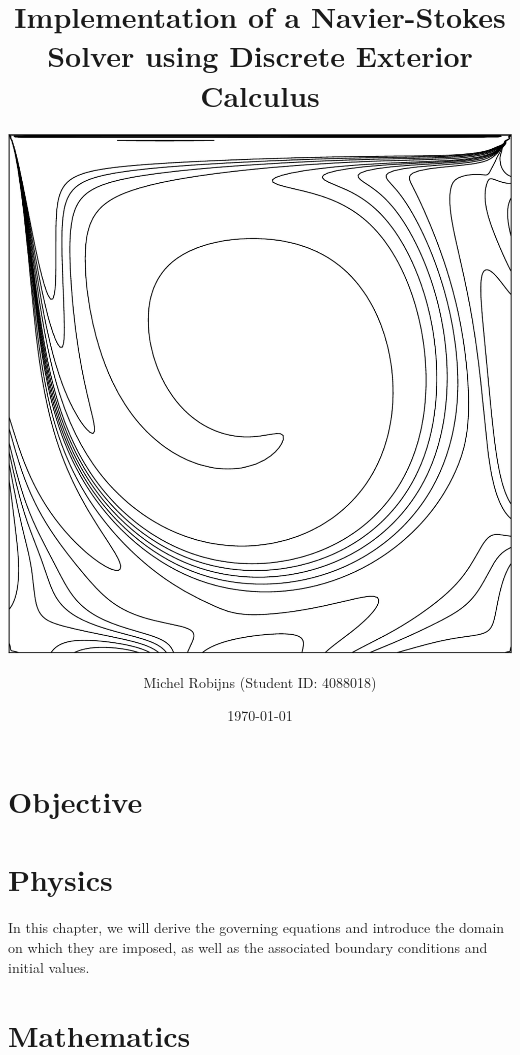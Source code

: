 \documentclass[a4paper, 11pt, toc=bibliography, parskip=half]{scrreprt}
\begin{document}
\titlehead{Delft University of Technology}
\subject{AE4134 - Computational Fluid Dynamics I}
\title{Implementation of a Navier-Stokes Solver using Discrete Exterior Calculus}
\subtitle{\vspace{2cm}\centering\includegraphics[width=0.8\linewidth]{Images/vorticity.pdf}\vspace{1.5cm}}
\author{Michel Robijns (Student ID: 4088018)}
\date{\today}

\maketitle

\tableofcontents

\chapter{Objective}



\chapter{Physics}
\label{cha:physics}

In this chapter, we will derive the governing equations and introduce the domain on which they are imposed, as well as the associated boundary conditions and initial values.




\chapter{Mathematics}
\label{cha:mathematics}
\end{document}
